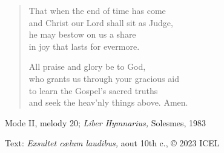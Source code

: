 \hymn



\setlength{\vleftmargin}{2em}
\begin{verse}
  That when the end of time has come\\
  and Christ our Lord shall sit as Judge,\\
  he may bestow on us a share\\
  in joy that lasts for evermore.

  All praise and glory be to God,\\
  who grants us through your gracious aid\\
  to learn the Gospel’s sacred truths\\
  and seek the heav’nly things above. Amen.
\end{verse}
\setlength{\vleftmargin}{\defleftmargini}

\begin{hymnsource}
Mode II, melody 20; \emph{Liber Hymnarius,} Solesmes, 1983

Text: \emph{Exsultet cælum laudibus,} aout 10th c., © 2023 ICEL
\end{hymnsource}
